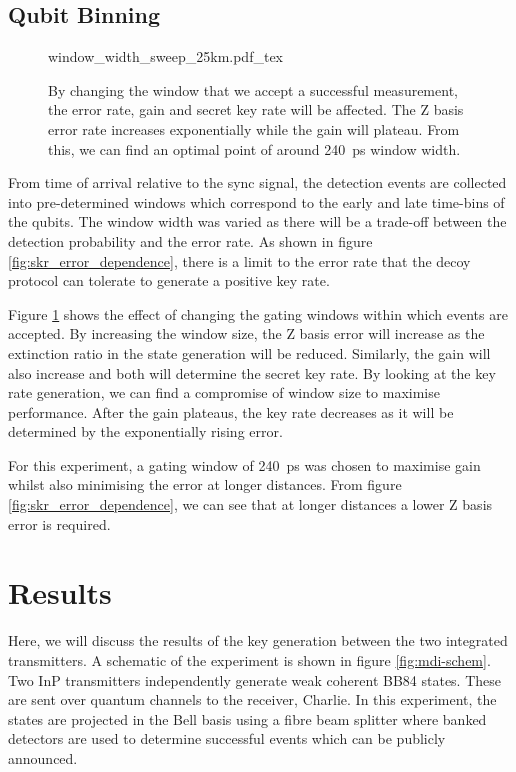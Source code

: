 \subsection{Qubit Binning}

\begin{figure}[t]
	\centering
	\tiny
	\def\svgwidth{\textwidth} 
	{window_width_sweep_25km.pdf_tex}
	\caption[Error, gain and key rate dependence on bin width]{By changing the window that we accept a successful measurement, the error rate, gain and secret key rate will be affected. The Z basis error rate increases exponentially while the gain will plateau. From this, we can find an optimal point of around \SI{240}{\ps} window width.}
	\label{fig:window_sweep}
\end{figure}

From time of arrival relative to the sync signal, the detection events are collected into pre-determined windows which correspond to the early and late time-bins of the qubits. The window width was varied as there will be a trade-off between the detection probability and the error rate. As shown in figure \ref{fig:skr_error_dependence}, there is a limit to the error rate that the decoy protocol can tolerate to generate a positive key rate.

Figure \ref{fig:window_sweep} shows the effect of changing the gating windows within which events are accepted. By increasing the window size, the Z basis error will increase as the extinction ratio in the state generation will be reduced. Similarly, the gain will also increase and both will determine the secret key rate. By looking at the key rate generation, we can find a compromise of window size to maximise performance. After the gain plateaus, the key rate decreases as it will be determined by the exponentially rising error.

For this experiment, a gating window of \SI{240}{\ps} was chosen to maximise gain whilst also minimising the error at longer distances. From figure \ref{fig:skr_error_dependence}, we can see that at longer distances a lower Z basis error is required.

\section{Results}

Here, we will discuss the results of the key generation between the two integrated transmitters. A schematic of the experiment is shown in figure \ref{fig:mdi-schem}. Two \ac{InP} transmitters independently generate weak coherent BB84 states. These are sent over quantum channels to the receiver, Charlie. In this experiment, the states are projected in the Bell basis using a fibre beam splitter where banked detectors are used to determine successful events which can be publicly announced. 

